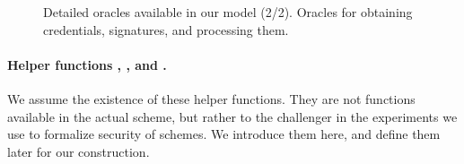 {\begin{figure*}[htp!]
{\begin{minipage}[t]{.5\textwidth}
        
      \end{minipage}
      
    }

    \caption{Detailed oracles available in our model (2/2). Oracles for
      obtaining credentials, signatures, and processing them.
    }
    \label{fig:oracles2}
  \end{figure*}
}

\paragraph{Helper functions \SimSetup, \ExtractIssue, and \ExtractSign.}
We assume the existence of these helper functions. They are not functions
available in the actual scheme, but rather to the challenger in the experiments
we use to formalize security of \UAS schemes. We introduce them here, and define
them later for our construction.

